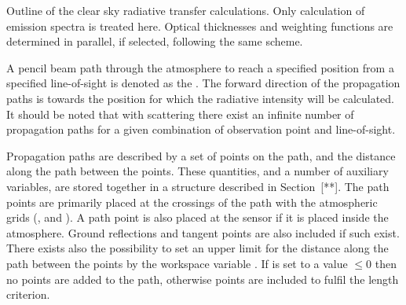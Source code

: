 \begin{algorithm}[!t]
 \begin{algorithmic}
  \ENDIF
     \ENDIF
    \ENDFOR
   \ENDFOR
  \ENDFOR
 \end{algorithmic}
 \caption{Outline of the clear sky radiative transfer calculations. Only
   calculation of emission spectra is treated here.
   Optical thicknesses and weighting functions are
   determined in parallel, if selected, following the same scheme.}
 \label{alg:fm_defs:rteCalc}
\end{algorithm}


\label{sec:fm_defs:ppaths}

A pencil beam path through the atmosphere to reach a specified
position from a specified line-of-sight is denoted as the
. The forward direction of the propagation
paths is towards the position for which the radiative intensity will
be calculated. It should be noted that with scattering there exist an
infinite number of propagation paths for a given combination of
observation point and line-of-sight.

Propagation paths are described by a set of points on the path, and
the distance along the path between the points. These quantities, and
a number of auxiliary variables, are stored together in a structure
described in Section~[**]. The path points are primarily placed at the
crossings of the path with the atmospheric grids (,
 and ). A path point is
also placed at the sensor if it is placed inside the atmosphere.
Ground reflections and tangent points are also included if such exist.
There exists also the possibility to set an upper limit for the
distance along the path between the points by the workspace variable
. If  is set to a value $\leq 0$
then no points are added to the path, otherwise points are included to
fulfil the length criterion.

